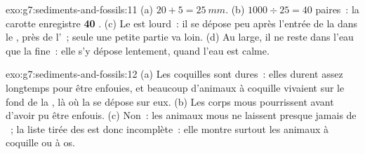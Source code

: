 \begin{solution}{exo:g7:sediments-and-fossils:11}
(a) $20 + 5 = \qty{25}{mm}$. (b) $1000 \div 25 = 40$ paires~: la carotte
enregistre \textbf{40 }. (c) Le  est lourd~: il se dépose peu
après l'entrée de la  dans le , près de l'~; seule une
petite partie va loin. (d) Au large, il ne reste dans l'eau que la 
fine~: elle s'y dépose lentement, quand l'eau est calme.
\end{solution}

\begin{solution}{exo:g7:sediments-and-fossils:12}
(a) Les coquilles sont dures~: elles durent assez longtemps pour être
enfouies, et beaucoup d'animaux à coquille vivaient sur le fond de la ,
là où la  se dépose sur eux. (b) Les corps mous pourrissent avant
d'avoir pu être enfouis. (c) Non~: les animaux mous ne laissent presque
jamais de ~; la liste tirée des  est donc incomplète~:
elle montre surtout les animaux à coquille ou à os.
\end{solution}

